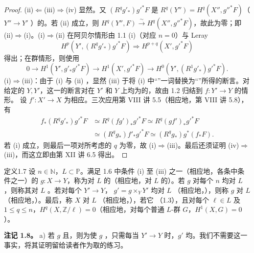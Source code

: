 \begin{proof}
(ii)$\Leftarrow$(iii)$\Rightarrow$(iv) 显然。又 $(R^qg'_*)g'^*F$ 是 $R^q(Y'')=H^q(X'',g''^*F)$（$Y''\to Y'$ ）的。若 (ii) 成立，则 $H^q(Y'',F)\xrightarrow{\sim}H^q(X'',g''^*F)$，故此为零；即 (ii)$\Rightarrow$(i)。(i)$\Rightarrow$(ii) 在阿贝尔情形由 1.1 (i)（对应 $n=0$）与 Leray 
\[H^p(Y',(R^qg'_*)g'^*F)\Longrightarrow H^{p+q}(X',g'^*F)\]
得出；在群情形，则使用
\[0\longrightarrow H^1(Y',g'_*g'^*F)\longrightarrow H^1(X',g'^*F)\longrightarrow H^0(Y',(R^1g'_*)g'^*F).\]
(i)$\Rightarrow$(iii)：由于 (i) 与 (ii) ，显然 (iii) 于将 (i) 中“”一词替换为“”所得的断言。对给定的 $Y,Y'$，这一的断言对在 $Y'$ 和 $Y$ 上均为的，故由 1.2 归结到 $f:Y'\to Y$ 的情形。
设 $f':X'\to X$ 为相应。三次应用第 VIII 讲 5.5（相应地，第 VIII 讲 5.8），有
\[
\begin{aligned}
f_*(R^qg'_*)g'^*F&\simeq R^q(fg')_*g'^*F\simeq R^q(gf')_*g'^*F\\
&\simeq(R^qg_*)f'_*g'^*F\simeq(R^qg_*)g^*(f_*F).
\end{aligned}
\]
若 (i) 成立，则最后一项对所考虑的 $q$ 为零，故 (i)$\Rightarrow$(iii)。最后还须证明 (iv)$\Rightarrow$(iii)，而这立即由第 XII 讲 6.5 得出。
\end{proof}
\begin{SGAresult}{定义}{1.7}
设 $n\in\mathbb N$，$L\subset\mathbb P$。满足 1.6 中条件 (i) 至 (iii) 之一（相应地，各条中条件之一）的 $g:X\to Y$，称为对 $L$ 的（相应地，对 $L$ 的）。若 $g$ 对每个 $n$ 均对 $L$ ，则称其对 $L$ 。若对每个 $Y'\to Y$， $g'=g\times_Y Y'$ 均对 $L$ （相应地，），则称 $g$ 对 $L$ （相应地，）。最后，称 $X$ 对 $L$ （相应地，），若它 （1.3），且对每个 $\ell\in L$ 及 $1\leq q\leq n$，$H^q(X,\mathbb Z/\ell)=0$（相应地，对每个普通 $L$-群 $G$，$H^1(X,G)=0$）。
\end{SGAresult}
\textbf{注记 1.8。}
a) 若 $g$ 且，则为使 $g$ ，只需每当 $Y'\to Y$ 时，$g'$ 均。我们不需要这一事实，将其证明留给读者作为取的练习。

